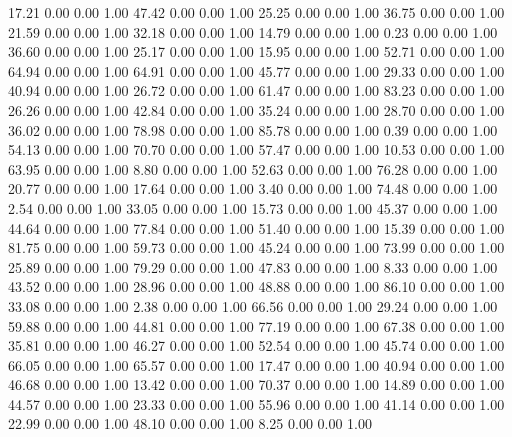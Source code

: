    17.21   0.00   0.00   1.00
   47.42   0.00   0.00   1.00
   25.25   0.00   0.00   1.00
   36.75   0.00   0.00   1.00
   21.59   0.00   0.00   1.00
   32.18   0.00   0.00   1.00
   14.79   0.00   0.00   1.00
    0.23   0.00   0.00   1.00
   36.60   0.00   0.00   1.00
   25.17   0.00   0.00   1.00
   15.95   0.00   0.00   1.00
   52.71   0.00   0.00   1.00
   64.94   0.00   0.00   1.00
   64.91   0.00   0.00   1.00
   45.77   0.00   0.00   1.00
   29.33   0.00   0.00   1.00
   40.94   0.00   0.00   1.00
   26.72   0.00   0.00   1.00
   61.47   0.00   0.00   1.00
   83.23   0.00   0.00   1.00
   26.26   0.00   0.00   1.00
   42.84   0.00   0.00   1.00
   35.24   0.00   0.00   1.00
   28.70   0.00   0.00   1.00
   36.02   0.00   0.00   1.00
   78.98   0.00   0.00   1.00
   85.78   0.00   0.00   1.00
    0.39   0.00   0.00   1.00
   54.13   0.00   0.00   1.00
   70.70   0.00   0.00   1.00
   57.47   0.00   0.00   1.00
   10.53   0.00   0.00   1.00
   63.95   0.00   0.00   1.00
    8.80   0.00   0.00   1.00
   52.63   0.00   0.00   1.00
   76.28   0.00   0.00   1.00
   20.77   0.00   0.00   1.00
   17.64   0.00   0.00   1.00
    3.40   0.00   0.00   1.00
   74.48   0.00   0.00   1.00
    2.54   0.00   0.00   1.00
   33.05   0.00   0.00   1.00
   15.73   0.00   0.00   1.00
   45.37   0.00   0.00   1.00
   44.64   0.00   0.00   1.00
   77.84   0.00   0.00   1.00
   51.40   0.00   0.00   1.00
   15.39   0.00   0.00   1.00
   81.75   0.00   0.00   1.00
   59.73   0.00   0.00   1.00
   45.24   0.00   0.00   1.00
   73.99   0.00   0.00   1.00
   25.89   0.00   0.00   1.00
   79.29   0.00   0.00   1.00
   47.83   0.00   0.00   1.00
    8.33   0.00   0.00   1.00
   43.52   0.00   0.00   1.00
   28.96   0.00   0.00   1.00
   48.88   0.00   0.00   1.00
   86.10   0.00   0.00   1.00
   33.08   0.00   0.00   1.00
    2.38   0.00   0.00   1.00
   66.56   0.00   0.00   1.00
   29.24   0.00   0.00   1.00
   59.88   0.00   0.00   1.00
   44.81   0.00   0.00   1.00
   77.19   0.00   0.00   1.00
   67.38   0.00   0.00   1.00
   35.81   0.00   0.00   1.00
   46.27   0.00   0.00   1.00
   52.54   0.00   0.00   1.00
   45.74   0.00   0.00   1.00
   66.05   0.00   0.00   1.00
   65.57   0.00   0.00   1.00
   17.47   0.00   0.00   1.00
   40.94   0.00   0.00   1.00
   46.68   0.00   0.00   1.00
   13.42   0.00   0.00   1.00
   70.37   0.00   0.00   1.00
   14.89   0.00   0.00   1.00
   44.57   0.00   0.00   1.00
   23.33   0.00   0.00   1.00
   55.96   0.00   0.00   1.00
   41.14   0.00   0.00   1.00
   22.99   0.00   0.00   1.00
   48.10   0.00   0.00   1.00
    8.25   0.00   0.00   1.00
